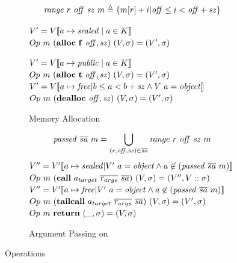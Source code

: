 \documentclass[10pt,conference]{ieeetran}%
\theoremstyle{definition}
\begin{document}
\begin{figure}
  \begin{subfigure}{0.4\textwidth}
    \[\mathit{range} ~ r ~ \mathit{off} ~ \mathit{sz} ~ m \triangleq
    \{m[r]+i | \mathit{off} \leq i < \mathit{off+sz}\}\]
    
               {\(V' = V \llbracket a \mapsto \mathit{sealed} \mid a \in K \rrbracket\)}
               {\(Op ~ m ~ (\mathbf{alloc} ~ \mathbf{f} ~ \mathit{off, sz}) ~ (V,\sigma) = (V',\sigma)\)}
             
               {\(V' = V \llbracket a \mapsto \mathit{public} \mid a \in K \rrbracket\)}
               {\(Op ~ m ~ (\mathbf{alloc} ~ \mathbf{t} ~ \mathit{off, sz}) ~ (V,\sigma) = (V',\sigma)\)}
               {\(V' = V \llbracket a \mapsto \mathit{free} |
                 b \leq a < b+\mathit{sz} \land V ~ a = \mathit{object} \rrbracket\)}
               {\(Op ~ m ~ (\mathbf{dealloc} ~ \mathit{off, sz}) ~ (V,\sigma) = (V',\sigma)\)}

    \caption{Memory Allocation}
    \label{sfig:publicalloc}
  \end{subfigure}
  \begin{subfigure}{0.6\textwidth}
    \[\mathit{passed} ~ \overline{sa} ~ m = \bigcup_{(r,\mathit{off},\mathit{sz}) \in \overline{sa}}
    \mathit{range} ~ r ~ \mathit{off} ~ \mathit{sz} ~ m\]
               {\(V'' = V'\llbracket a \mapsto \mathit{sealed} | V' ~ a = \mathit{object} \land a \not \in (\mathit{passed} ~ \overline{sa} ~ m) \rrbracket\)}
               {\(Op ~ m ~ (\mathbf{call} ~ a_{target} ~ \overline{r_{args}} ~ \overline{sa})
                 ~ (V,\sigma) = (V'',V::\sigma)\)}
               {\(V'' = V'\llbracket a \mapsto \mathit{free} | V' ~ a = \mathit{object} \land a \not \in (\mathit{passed} ~ \overline{sa} ~ m) \rrbracket\)}
               {\(Op ~ m ~ (\mathbf{tailcall} ~ a_{target} ~ \overline{r_{args}} ~ \overline{sa})
                 ~ (V,\sigma) = (V',\sigma)\)}
             {\(Op ~ m ~ \mathbf{return} ~ (\_, \sigma) = (V, \sigma)\)}

    \caption{Argument Passing on }
    \label{sfig:stkargs}
  \end{subfigure}
  \caption{Operations}
  \label{fig:advops}
\end{figure}
           
\end{document}
